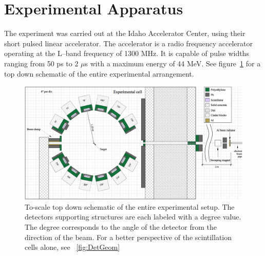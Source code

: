 \section{Experimental Apparatus}
The experiment was carried out at the Idaho Accelerator Center, using their short pulsed linear accelerator.
The accelerator is a radio frequency accelerator operating at the L--band frequency of 1300 MHz.
It is capable of pulse widths ranging from 50 ps to 2 $\mu$s with a maximum energy of 44 MeV.
See figure~\ref{fig:Facility} for a top down schematic of the entire experimental arrangement.
\begin{figure}[h]
\includegraphics[width=\textwidth]{Content/Methods/ExpArangment.png}
\caption{To-scale top down schematic of the entire experimental setup.
The detectors supporting structures are each labeled with a degree value.
The degree corresponds to the angle of the detector from the direction of the beam.
For a better perspective of the scintillation cells alone, see ~\ref{fig:DetGeom}}
\label{fig:Facility}
\end{figure}

